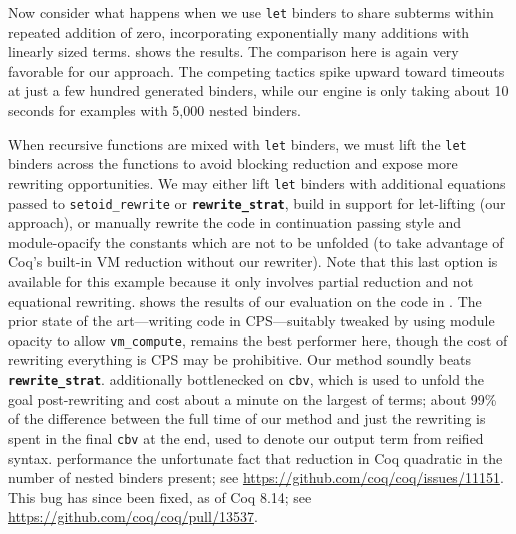 \documentclass[sn-mathphys,pdflatex]{sn-jnl}%
\makeatletter
\let\@badhref=\href
\renewcommand{\href}[2]{\@badhref{#2}{#1}}
\newcommand{\coqbug}[2][Coq bug~]{\href{https://github.com/coq/coq/issues/#2}{#1\##2}}
\newcommand{\coqpr}[2][Coq PR~]{\href{https://github.com/coq/coq/pull/#2}{#1\##2}}
\newcommand{\tacvmcompute}{\texttt{vm_compute}}
\newcommand{\taccbv}{\texttt{cbv}}
\newcommand{\tacsetoidrewrite}{\texttt{setoid_rewrite}}
\newcommand{\tacrewritestrat}{\textbf{\texttt{rewrite\_strat}}}
\theoremstyle{thmstyleone}%
\theoremstyle{thmstyletwo}%
\theoremstyle{thmstylethree}%
\makeatother
\begin{document}
Now consider what happens when we use \texttt{let} binders to share subterms within repeated addition of zero, incorporating exponentially many additions with linearly sized terms.
 shows the results.
The comparison here is again very favorable for our approach.
The competing tactics spike upward toward timeouts at just a few hundred generated binders, while our engine is only taking about 10 seconds for examples with 5,000 nested binders.

When recursive functions are mixed with \texttt{let} binders, we must lift the \texttt{let} binders across the functions to avoid blocking reduction and expose more rewriting opportunities.
We may either lift \texttt{let} binders with additional equations passed to \tacsetoidrewrite{} or \tacrewritestrat{}, build in support for let-lifting (our approach), or manually rewrite the code in continuation passing style and module-opacify the constants which are not to be unfolded (to take advantage of Coq's built-in VM reduction without our rewriter).
Note that this last option is available for this example because it only involves partial reduction and not equational rewriting.
 shows the results of our evaluation on the code in .
The prior state of the art---writing code in CPS---suitably tweaked by using module opacity to allow \tacvmcompute{}, remains the best performer here, though the cost of rewriting everything is CPS may be prohibitive.
Our method soundly beats \tacrewritestrat{}.
 additionally bottlenecked on \taccbv{}, which is used to unfold the goal post-rewriting and cost about a minute on the largest of terms; about 99\% of the difference between the full time of our method and just the rewriting is spent in the final \taccbv{} at the end, used to denote our output term from reified syntax.
\label{sentence:final-cbv-perf-blame}%
 performance  the unfortunate fact that reduction in Coq  quadratic in the number of nested binders present; see \coqbug{11151}.
This bug has since been fixed, as of Coq 8.14; see \coqpr{13537}.
\end{document}
